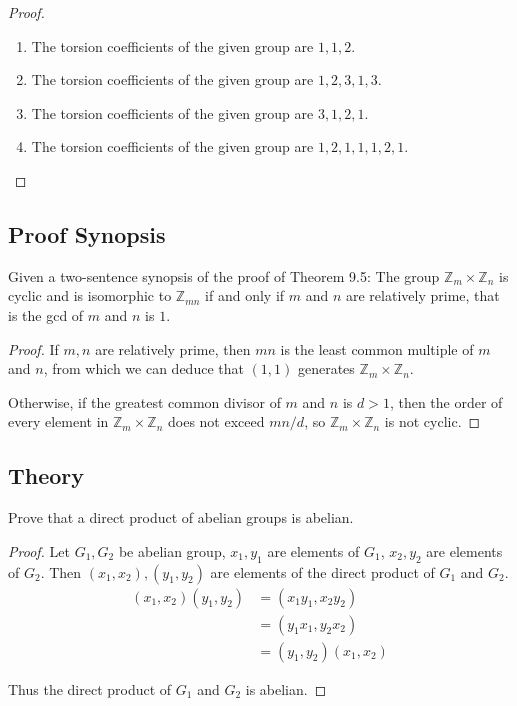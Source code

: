 \begin{proof}
    \begin{enumerate}[label={\textbf{\alph*.}}]
        \item The torsion coefficients of the given group are $1, 1, 2$.
        \item The torsion coefficients of the given group are $1, 2, 3, 1, 3$.
        \item The torsion coefficients of the given group are $3, 1, 2, 1$.
        \item The torsion coefficients of the given group are $1, 2, 1, 1, 1, 2, 1$.
    \end{enumerate}
\end{proof}

\subsection*{Proof Synopsis}

\newpage
\begin{exercise}
    Given a two-sentence synopsis of the proof of Theorem 9.5: The group $\mathbb{Z}_{m}\times \mathbb{Z}_{n}$ is cyclic and is isomorphic to $\mathbb{Z}_{mn}$ if and only if $m$ and $n$ are relatively prime, that is the gcd of $m$ and $n$ is $1$.
\end{exercise}

\begin{proof}
    If $m, n$ are relatively prime, then $mn$ is the least common multiple of $m$ and $n$, from which we can deduce that $(1,1)$ generates $\mathbb{Z}_{m}\times\mathbb{Z}_{n}$.

    Otherwise, if the greatest common divisor of $m$ and $n$ is $d > 1$, then the order of every element in $\mathbb{Z}_{m}\times\mathbb{Z}_{n}$ does not exceed $mn/d$, so $\mathbb{Z}_{m}\times\mathbb{Z}_{n}$ is not cyclic.
\end{proof}

\subsection*{Theory}

\newpage
\begin{exercise}
    Prove that a direct product of abelian groups is abelian.
\end{exercise}

\begin{proof}
    Let $G_{1}, G_{2}$ be abelian group, $x_{1}, y_{1}$ are elements of $G_{1}$, $x_{2}, y_{2}$ are elements of $G_{2}$. Then $(x_{1}, x_{2}), (y_{1}, y_{2})$ are elements of the direct product of $G_{1}$ and $G_{2}$.
    \begin{align*}
        (x_{1}, x_{2})(y_{1}, y_{2}) & = (x_{1}y_{1}, x_{2}y_{2})     \\
                                     & = (y_{1}x_{1}, y_{2}x_{2})     \\
                                     & = (y_{1}, y_{2})(x_{1}, x_{2})
    \end{align*}

    Thus the direct product of $G_{1}$ and $G_{2}$ is abelian.
\end{proof}

